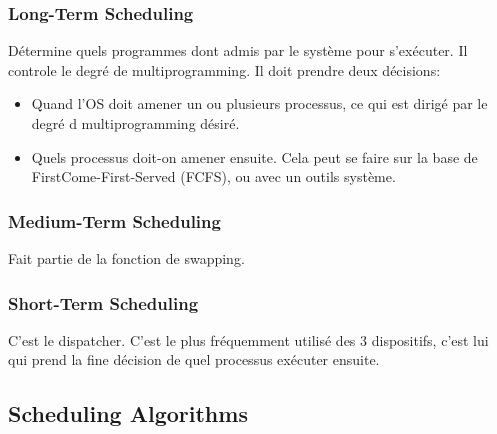 \subsubsection{Long-Term Scheduling}
Détermine quels programmes dont admis par le système pour s'exécuter.
Il controle le degré de multiprogramming.
Il doit prendre deux décisions:
\begin{itemize}
  \item Quand l'OS doit amener un ou plusieurs processus, ce qui est dirigé par le degré d multiprogramming désiré.
  \item Quels processus doit-on amener ensuite.
    Cela peut se faire sur la base de FirstCome-First-Served (FCFS), ou avec un outils système.
\end{itemize}

\subsubsection{Medium-Term Scheduling}
Fait partie de la fonction de swapping.

\subsubsection{Short-Term Scheduling}
C'est le dispatcher.
C'est le plus fréquemment utilisé des 3 dispositifs, c'est lui qui prend la fine décision de quel processus exécuter ensuite.

\subsection{Scheduling Algorithms }

